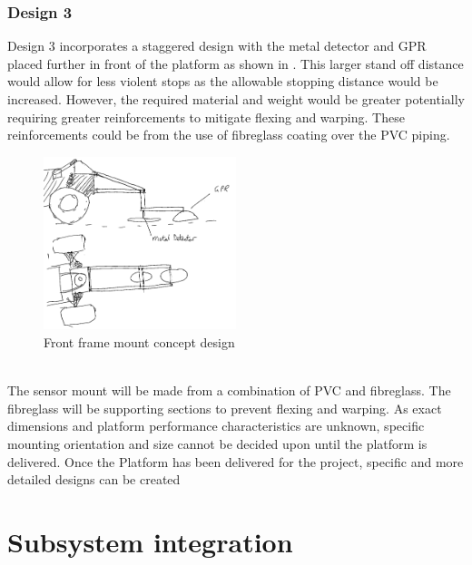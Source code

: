 \documentclass[main.tex]{subfiles}
\begin{document}
\subsubsection{Design 3}
Design 3 incorporates a staggered design with the metal detector and GPR placed further in front of the platform as shown in . This larger stand off distance would allow for less violent stops as the allowable stopping distance would be increased. However, the required material and weight would be greater potentially requiring greater reinforcements to mitigate flexing and warping. These reinforcements could be from the use of fibreglass coating over the PVC piping.
\begin{figure}[ht]
\includegraphics[width=0.5\textwidth]{3-ConceptDesign/front_mount_staggered.png}
\centering
\caption{Front frame mount concept design}
\end{figure}\\

The sensor mount will be made from a combination of PVC and fibreglass. The fibreglass will be supporting sections to prevent flexing and warping. As exact dimensions and platform performance characteristics are unknown, specific mounting orientation and size cannot be decided upon until the platform is delivered. Once the Platform has been delivered for the project, specific and more detailed designs can be created

\section{Subsystem integration}

\end{document}
